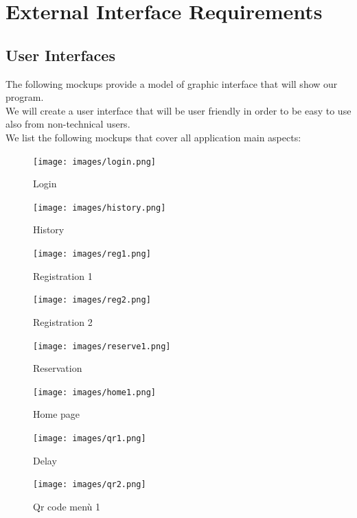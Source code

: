 \section{External Interface Requirements}
\subsection{User Interfaces}
The following mockups provide a model of graphic interface that will show our program. \\
We will create a user interface that will be user friendly in order to be easy to use also from non-technical users. \\
We list the following mockups that cover all application main aspects: \\

\begin{figure}
	\begin{minipage}{0.48\textwidth}
		\centering
		\texttt{[image: images/login.png]}
		\caption{Login}
	\end{minipage}
	\hfill
	\begin{minipage}{0.48\textwidth}
		\centering
		\texttt{[image: images/history.png]}
		\caption{History}
	\end{minipage}
\end{figure}

\begin{figure}
	\begin{minipage}{0.48\textwidth}
		\centering
		\texttt{[image: images/reg1.png]}
		\caption{Registration 1}
	\end{minipage}
	\hfill
	\begin{minipage}{0.48\textwidth}
		\centering
		\texttt{[image: images/reg2.png]}
		\caption{Registration 2}
	\end{minipage}
\end{figure}


\begin{figure}
	\begin{minipage}{0.48\textwidth}
		\centering
		\texttt{[image: images/reserve1.png]}
		\caption{Reservation}
	\end{minipage}
	\hfill
	\begin{minipage}{0.48\textwidth}
		\centering
		\texttt{[image: images/home1.png]}
		\caption{Home page}
	\end{minipage}
\end{figure}

\begin{figure}
	\begin{minipage}{0.48\textwidth}
		\centering
		\texttt{[image: images/qr1.png]}
		\caption{Delay}
	\end{minipage}
	\hfill
	\begin{minipage}{0.48\textwidth}
		\centering
		\texttt{[image: images/qr2.png]}
		\caption{Qr code menù 1}
	\end{minipage}
\end{figure}

